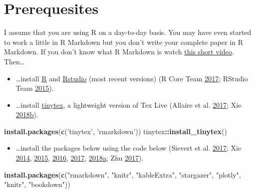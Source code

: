 \documentclass[12pt,]{article}
\newenvironment{Shaded}{\begin{snugshade}}{\end{snugshade}}
\newcommand{\KeywordTok}[1]{\textcolor[rgb]{0.13,0.29,0.53}{\textbf{#1}}}
\newcommand{\StringTok}[1]{\textcolor[rgb]{0.31,0.60,0.02}{#1}}
\newcommand{\OperatorTok}[1]{\textcolor[rgb]{0.81,0.36,0.00}{\textbf{#1}}}
\newcommand{\NormalTok}[1]{#1}
\providecommand{\tightlist}{%
  \setlength{\itemsep}{0pt}\setlength{\parskip}{0pt}}
\theoremstyle{definition}
\theoremstyle{definition}
\theoremstyle{definition}
\theoremstyle{remark}
\begin{document}
\section{Prerequesites}\label{prerequesites}

I assume that you are using R on a day-to-day basis. You may have even
started to work a little in R Markdown but you don't write your complete
paper in R Markdown. If you don't know what R Markdown is watch
\href{https://vimeo.com/178485416}{this short video}. Then\ldots{}

\begin{itemize}
\tightlist
\item
  \ldots{}install \href{https://www.r-project.org/}{R} and
  \href{https://www.rstudio.com/}{Rstudio} (most recent versions) (R
  Core Team \protect\hyperlink{ref-R2017}{2017}; RStudio Team
  \protect\hyperlink{ref-Rstudio2015}{2015}).
\item
  \ldots{}install \href{https://yihui.name/tinytex/}{tinytex}, a
  lightweight version of Tex Live (Allaire et al.
  \protect\hyperlink{ref-markdown2017}{2017}; Xie
  \protect\hyperlink{ref-tinytex}{2018}\protect\hyperlink{ref-tinytex}{b}).
\end{itemize}

\begin{Shaded}
\begin{Highlighting}[]
\KeywordTok{install.packages}\NormalTok{(}\KeywordTok{c}\NormalTok{(}\StringTok{'tinytex'}\NormalTok{, }\StringTok{'rmarkdown'}\NormalTok{))}
\NormalTok{tinytex}\OperatorTok{::}\KeywordTok{install_tinytex}\NormalTok{()}
\end{Highlighting}
\end{Shaded}

\begin{itemize}
\tightlist
\item
  \ldots{}install the packages below using the code below (Sievert et
  al. \protect\hyperlink{ref-plotly}{2017}; Xie
  \protect\hyperlink{ref-knitr3}{2014},
  \protect\hyperlink{ref-knitr2}{2015},
  \protect\hyperlink{ref-bookdown2}{2016},
  \protect\hyperlink{ref-bookdown1}{2017},
  \protect\hyperlink{ref-knitr1}{2018}\protect\hyperlink{ref-knitr1}{a};
  Zhu \protect\hyperlink{ref-kableextra}{2017}).
\end{itemize}

\begin{Shaded}
\begin{Highlighting}[]
\KeywordTok{install.packages}\NormalTok{(}\KeywordTok{c}\NormalTok{(}\StringTok{"rmarkdown"}\NormalTok{, }\StringTok{"knitr"}\NormalTok{, }\StringTok{"kableExtra"}\NormalTok{,}
                   \StringTok{"stargazer"}\NormalTok{, }\StringTok{"plotly"}\NormalTok{, }\StringTok{"knitr"}\NormalTok{,}
                   \StringTok{"bookdown"}\NormalTok{))}
\end{Highlighting}
\end{Shaded}
\end{document}
